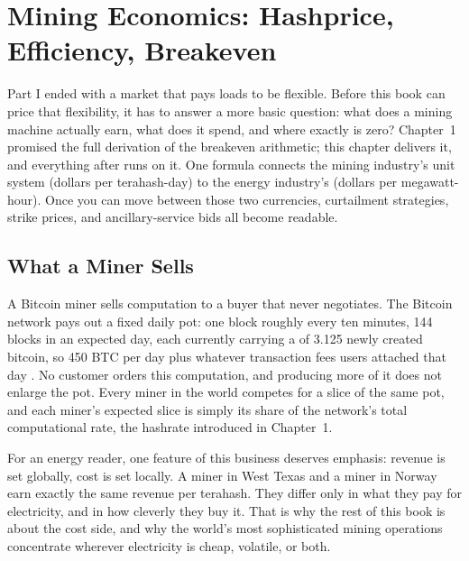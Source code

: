 \chapter{Mining Economics: Hashprice, Efficiency, Breakeven}
\label{ch:economics}

Part I ended with a market that pays loads to be flexible. Before this book can price that flexibility, it has to answer a more basic question: what does a mining machine actually earn, what does it spend, and where exactly is zero? Chapter~1 promised the full derivation of the breakeven arithmetic; this chapter delivers it, and everything after runs on it. One formula connects the mining industry's unit system (dollars per terahash-day) to the energy industry's (dollars per megawatt-hour). Once you can move between those two currencies, curtailment strategies, strike prices, and ancillary-service bids all become readable.

\section{What a Miner Sells}

A Bitcoin miner sells computation to a buyer that never negotiates. The Bitcoin network pays out a fixed daily pot: one block roughly every ten minutes, 144 blocks in an expected day, each currently carrying a  of 3.125 newly created bitcoin, so 450 BTC per day plus whatever transaction fees users attached that day \autocite{Nakamoto2008}. %
No customer orders this computation, and producing more of it does not enlarge the pot. Every miner in the world competes for a slice of the same pot, and each miner's expected slice is simply its share of the network's total computational rate, the hashrate introduced in Chapter~1.

For an energy reader, one feature of this business deserves emphasis: revenue is set globally, cost is set locally. A miner in West Texas and a miner in Norway earn exactly the same revenue per terahash. They differ only in what they pay for electricity, and in how cleverly they buy it. That is why the rest of this book is about the cost side, and why the world's most sophisticated mining operations concentrate wherever electricity is cheap, volatile, or both.


